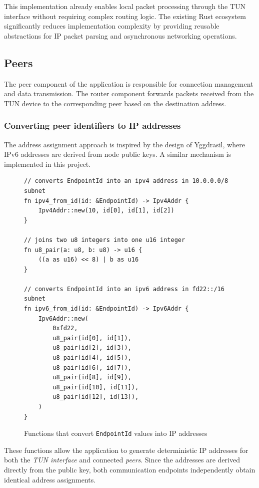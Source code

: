 \documentclass[a4paper, 10pt]{article}
\begin{document}
This implementation already enables local packet processing through the TUN interface without requiring complex routing logic.
The existing Rust ecosystem significantly reduces implementation complexity by providing reusable abstractions for IP packet parsing and asynchronous networking operations.

\subsection{Peers} \label{sec:apppeers}

The peer component of the application is responsible for connection management and data transmission.
The router component forwards packets received from the TUN device to the corresponding peer based on the destination address.

\subsubsection{Converting peer identifiers to IP addresses}

The address assignment approach is inspired by the design of Yggdrasil, where IPv6 addresses are derived from node public keys.
A similar mechanism is implemented in this project.
\begin{figure}[H]
  \begin{verbatim}
// converts EndpointId into an ipv4 address in 10.0.0.0/8 subnet
fn ipv4_from_id(id: &EndpointId) -> Ipv4Addr {
    Ipv4Addr::new(10, id[0], id[1], id[2])
}

// joins two u8 integers into one u16 integer
fn u8_pair(a: u8, b: u8) -> u16 {
    ((a as u16) << 8) | b as u16
}

// converts EndpointId into an ipv6 address in fd22::/16 subnet
fn ipv6_from_id(id: &EndpointId) -> Ipv6Addr {
    Ipv6Addr::new(
        0xfd22,
        u8_pair(id[0], id[1]),
        u8_pair(id[2], id[3]),
        u8_pair(id[4], id[5]),
        u8_pair(id[6], id[7]),
        u8_pair(id[8], id[9]),
        u8_pair(id[10], id[11]),
        u8_pair(id[12], id[13]),
    )
}
  \end{verbatim}
  \caption{Functions that convert \texttt{EndpointId} values into IP addresses}
\end{figure}

These functions allow the application to generate deterministic IP addresses for both the \emph{TUN interface} and connected \emph{peers}.
Since the addresses are derived directly from the public key, both communication endpoints independently obtain identical address assignments.
\end{document}
